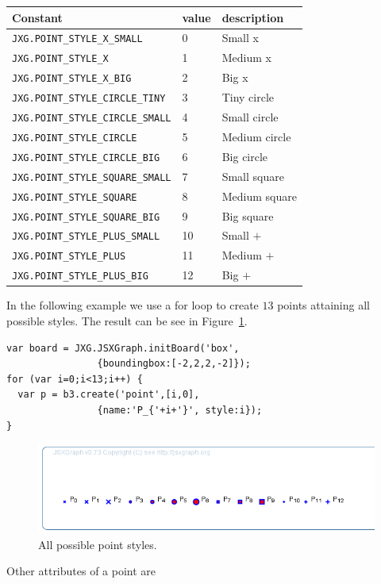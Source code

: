 \bigskip
\begin{center}
\footnotesize
\begin{tabular}{lll}
\toprule
Constant &    value   & description \\
\midrule
\lstinline|JXG.POINT_STYLE_X_SMALL| &     0  & Small x \\
\lstinline|JXG.POINT_STYLE_X|  & 1&   Medium x \\
\lstinline|JXG.POINT_STYLE_X_BIG|  & 2  & Big x \\
\lstinline|JXG.POINT_STYLE_CIRCLE_TINY|  &   3 &  Tiny circle \\
\lstinline|JXG.POINT_STYLE_CIRCLE_SMALL|  &  4  & Small circle \\
\lstinline|JXG.POINT_STYLE_CIRCLE| & 5 &  Medium circle \\
\lstinline|JXG.POINT_STYLE_CIRCLE_BIG| & 6  & Big circle \\
\lstinline|JXG.POINT_STYLE_SQUARE_SMALL|&   7&   Small square \\
\lstinline|JXG.POINT_STYLE_SQUARE|&  8  & Medium square \\
\lstinline|JXG.POINT_STYLE_SQUARE_BIG|&  9 &  Big square \\
\lstinline|JXG.POINT_STYLE_PLUS_SMALL|&  10 & Small $+$ \\
\lstinline|JXG.POINT_STYLE_PLUS|&   11  &Medium $+$ \\
\lstinline|JXG.POINT_STYLE_PLUS_BIG| &   12  &Big $+$ \\
\bottomrule
\end{tabular}
\end{center}
In the following example we use a for loop to create $13$ points attaining all possible styles. The result can be see in Figure~\ref{fig:4}.
\begin{lstlisting}
var board = JXG.JSXGraph.initBoard('box', 
                {boundingbox:[-2,2,2,-2]});
for (var i=0;i<13;i++) {
  var p = b3.create('point',[i,0], 
                {name:'P_{'+i+'}', style:i});
}
\end{lstlisting}
\begin{figure}[h]
\centerline{\includegraphics[width=0.4\linewidth]{images/b5.png}}
\caption{All possible point styles.}\label{fig:4}
\end{figure}
Other attributes of a point are
\bigskip
